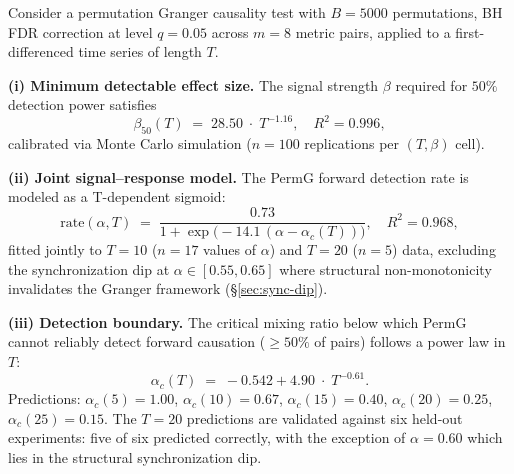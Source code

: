 \begin{proposition}
\label{prop:detection-bound}
Consider a permutation Granger causality test with $B = 5000$ permutations, BH FDR correction at level $q = 0.05$ across $m = 8$ metric pairs, applied to a first-differenced time series of length $T$.

\noindent\textbf{(i) Minimum detectable effect size.}
The signal strength $\beta$ required for $50\%$ detection power satisfies
\begin{equation}
  \beta_{50}(T) \;=\; 28.50 \;\cdot\; T^{-1.16}, \quad R^2 = 0.996,
  \label{eq:beta50}
\end{equation}
calibrated via Monte Carlo simulation ($n = 100$ replications per $(T, \beta)$ cell).

\noindent\textbf{(ii) Joint signal--response model.}
The PermG forward detection rate is modeled as a T-dependent sigmoid:
\begin{equation}
  \mathrm{rate}(\alpha, T) \;=\; \frac{0.73}{1 + \exp\!\bigl(-14.1\,(\alpha - \alpha_c(T))\bigr)}, \quad R^2 = 0.968,
  \label{eq:joint-sigmoid}
\end{equation}
fitted jointly to $T = 10$ ($n = 17$ values of $\alpha$) and $T = 20$ ($n = 5$) data, excluding the synchronization dip at $\alpha \in [0.55, 0.65]$ where structural non-monotonicity invalidates the Granger framework (\S\ref{sec:sync-dip}).

\noindent\textbf{(iii) Detection boundary.}
The critical mixing ratio below which PermG cannot reliably detect forward causation ($\geq 50\%$ of pairs) follows a power law in $T$:
\begin{equation}
  \alpha_c(T) \;=\; -0.542 + 4.90 \;\cdot\; T^{-0.61}.
  \label{eq:alpha-c}
\end{equation}
Predictions: $\alpha_c(5) = 1.00$, $\alpha_c(10) = 0.67$, $\alpha_c(15) = 0.40$, $\alpha_c(20) = 0.25$, $\alpha_c(25) = 0.15$.
The $T = 20$ predictions are validated against six held-out experiments: five of six predicted correctly, with the exception of $\alpha = 0.60$ which lies in the structural synchronization dip.
\end{proposition}